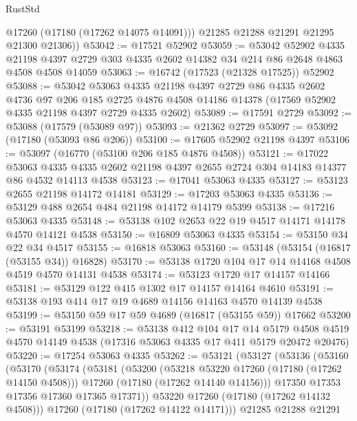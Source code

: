 \begin{lexlean}{RustStd}
\begin{coremodule}
{\begin{coremodule}
{{{{{{{{{{{{{{{{{{{{{{{{{{{{{{{{{{{{{{{{{{{{{{{{{{{{{{{          @17260
          (@17180 (@17262 @14075 @14091)))
        @21285
        @21288
        @21291
        @21295
        @21300
        @21306))
@53042 := @17521 @52902
@53059 := @53042
    @52902
    @4335
    @21198
    @4397
    @2729
    @303
    @4335
    @2602
    @14382
    @34
    @214
    @86
    @2648
    @4863
    @4508
    @4508
    @14059
@53063 := @16742 (@17523 (@21328 @17525)) @52902
@53088 := @53042
    @53063
    @4335
    @21198
    @4397
    @2729
    @86
    @4335
    @2602
    @4736
    @97
    @206
    @185
    @2725
    @4876
    @4508
    @14186
    @14378
    (@17569 @52902 @4335 @21198 @4397 @2729 @4335 @2602)
@53089 := @17591 @2729
@53092 := @53088 (@17579 (@53089 @97))
@53093 := @21362 @2729
@53097 := @53092 (@17180 (@53093 @86 @206))
@53100 := @17605 @52902 @21198 @4397
@53106 := @53097 (@16770 (@53100 @206 @185 @4876 @4508))
@53121 := @17022
    @53063
    @4335
    @4335
    @2602
    @21198
    @4397
    @2655
    @2724
    @304
    @14183
    @14377
    @86
    @4532
    @14113
    @4538
@53123 := @17041 @53063 @4335
@53127 := @53123 @2655 @21198 @14172 @14181
@53129 := @17203 @53063 @4335
@53136 := @53129 @488 @2654 @484 @21198 @14172 @14179 @5399
@53138 := @17216 @53063 @4335
@53148 := @53138 @102 @2653 @22 @19 @4517 @14171 @14178 @4570 @14121 @4538
@53150 := @16809 @53063 @4335
@53154 := @53150 @34 @22 @34 @4517
@53155 := @16818 @53063
@53160 := @53148 (@53154 (@16817 (@53155 @34)) @16828)
@53170 := @53138 @1720 @104 @17 @14 @14168 @4508 @4519 @4570 @14131 @4538
@53174 := @53123 @1720 @17 @14157 @14166
@53181 := @53129 @122 @415 @1302 @17 @14157 @14164 @4610
@53191 := @53138 @193 @414 @17 @19 @4689 @14156 @14163 @4570 @14139 @4538
@53199 := @53150 @59 @17 @59 @4689 (@16817 (@53155 @59)) @17662
@53200 := @53191 @53199
@53218 := @53138
    @412
    @104
    @17
    @14
    @5179
    @4508
    @4519
    @4570
    @14149
    @4538
    (@17316 @53063 @4335 @17 @411 @5179 @20472 @20476)
@53220 := @17254 @53063 @4335
@53262 := @53121
    (@53127
      (@53136
        (@53160
          (@53170
            (@53174
              (@53181
                (@53200
                  (@53218 @53220 @17260 (@17180 (@17262 @14150 @4508)))
                  @17260
                  (@17180 (@17262 @14140 @14156)))
                @17350
                @17353
                @17356
                @17360
                @17365
                @17371))
            @53220
            @17260
            (@17180 (@17262 @14132 @4508)))
          @17260
          (@17180 (@17262 @14122 @14171)))
        @21285
        @21288
        @21291
}}}}}}}}}}}}}}}}}}}}}}}}}}}}}}}}}}}}}}}}}}}}}}}}}}}}}}}
\end{coremodule}}
\end{coremodule}
\end{lexlean}
